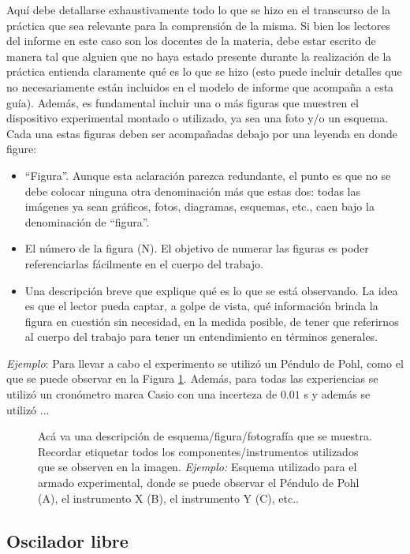 \documentclass[12pt,a4paper]{article}
\begin{document}
Aquí debe detallarse exhaustivamente todo lo que se hizo en el transcurso de la práctica que sea relevante para la comprensión de la misma. Si bien los lectores del informe en este caso son los docentes de la materia, debe estar escrito de manera tal que alguien que no haya estado presente durante la realización de la práctica entienda claramente qué es lo que se hizo (esto puede incluir detalles que no necesariamente están incluidos en el modelo de informe que acompaña a esta guía). Además, es fundamental incluir una o más figuras que muestren el dispositivo experimental montado o utilizado, ya sea una foto y/o un esquema. Cada una estas figuras deben ser acompañadas debajo por una leyenda en donde figure:
\begin{itemize}
    \item “Figura”. Aunque esta aclaración parezca redundante, el punto es que no se debe colocar ninguna otra denominación más que estas dos: todas las imágenes ya sean gráficos, fotos, diagramas, esquemas, etc., caen bajo la denominación de “figura”.
    \item El número de la figura (N). El objetivo de numerar las figuras es poder referenciarlas fácilmente en el cuerpo del trabajo.
    \item Una descripción breve que explique qué es lo que se está observando. La idea es que el lector pueda captar, a golpe de vista, qué información brinda la figura en cuestión sin necesidad, en la medida posible, de tener que referirnos al cuerpo del trabajo para tener un entendimiento en términos generales.
\end{itemize}

\textit{Ejemplo}: Para llevar a cabo el experimento se utilizó un Péndulo de Pohl, como el que se puede observar en la Figura \ref{fig1}. Además, para todas las experiencias se utilizó un cronómetro marca Casio con una incerteza de $0.01$ s y además se utilizó ... 

\begin{figure}[ht]
    \centering
    \caption{Acá va una descripción de esquema/figura/fotografía que se muestra. Recordar etiquetar todos los componentes/instrumentos utilizados que se observen en la imagen. \textit{Ejemplo:} Esquema utilizado para el armado experimental, donde se puede observar el Péndulo de Pohl (A), el instrumento X (B), el instrumento Y (C), etc..}
    \label{fig1}
\end{figure}

\subsection{Oscilador libre}
\end{document}
